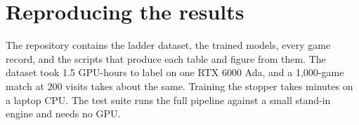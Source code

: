 \section{Reproducing the results}

The repository contains the ladder dataset, the trained models, every game record, and the scripts that produce each table and figure from them. The dataset took 1.5 GPU-hours to label on one RTX 6000 Ada, and a 1{,}000-game match at 200 visits takes about the same. Training the stopper takes minutes on a laptop CPU. The test suite runs the full pipeline against a small stand-in engine and needs no GPU.
